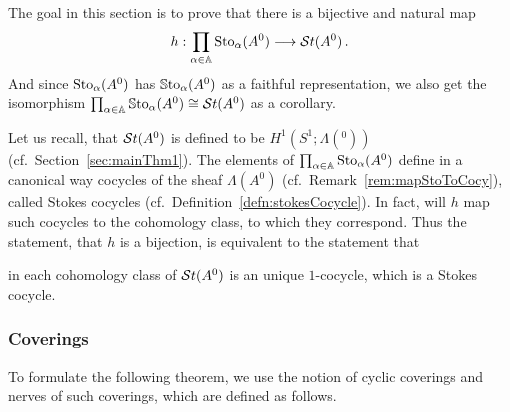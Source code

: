 The goal in this section is to prove that there is a bijective and natural map
\[
  h:\prod_{\alpha\in\mathbb{A}}\operatorname{Sto}_\alpha(A^0)\longrightarrow\mathcal{S}{}t(A^0) \,.
\]
And since $\operatorname{Sto}_\alpha(A^0)$ has $\operatorname{\mathbb{S}to}_\alpha(A^0)$ as a faithful
representation, we also get the isomorphism
$\prod_{\alpha\in\mathbb{A}}\operatorname{\mathbb{S}to}_\alpha(A^0)\cong\mathcal{S}{}t(A^0)$ as a corollary.

Let us recall, that $\mathcal{S}{}t(A^0)$ is defined to be $H^1(S^1;\Lambda(^0))$
(cf.\ Section~\ref{sec:mainThm1}).
The elements of $\prod_{\alpha\in\mathbb{A}}\operatorname{Sto}_\alpha(A^0)$ define in a canonical way
cocycles of the sheaf $\Lambda(A^0)$ (cf.\ Remark~\ref{rem:mapStoToCocy}),
called Stokes cocycles (cf.\ Definition~\ref{defn:stokesCocycle}).
In fact, will $h$ map such cocycles to the cohomology class, to which they
correspond.
Thus the statement, that $h$ is a bijection, is equivalent to the statement
that
\begin{einr}
  in each cohomology class of $\mathcal{S}{}t(A^0)$ is an unique $1$-cocycle, which is a
  Stokes cocycle.
\end{einr}

\subsubsection{Coverings}
To formulate the following theorem, we use the notion of cyclic coverings and
nerves of such coverings, which are defined as follows.

